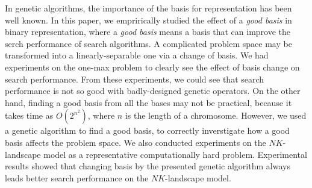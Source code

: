 In genetic algorithms, the importance of the basis for representation has been well known.
In this paper, we emprirically studied the effect of a \textit{good basis} in binary representation, where a \textit{good basis} means a basis that can improve the serch performance of search algorithms.
A complicated problem space may be transformed into a linearly-separable one via a change of basis.
We had experiments on the one-max problem to clearly see the effect of basis change on search performance.
From these experiments, we could see that search performance is not so good with badly-designed genetic operators.
On the other hand, finding a good basis from all the bases may not be practical, because it takes time as $ O(2^{n^2}) $, where $ n $ is the length of a chromosome.
However, we used a genetic algorithm to find a good basis, to correctly inverstigate how a good basis affects the problem space.
We also conducted experiments on the $ NK $-landscape model as a representative computationally hard problem.
Experimental results showed that changing basis by the presented genetic algorithm always leads better search performance on the $ NK $-landscape model.
